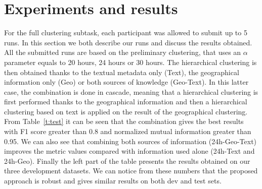 \documentclass{acm_proc_article-me11_tweaked}
\begin{document}
\section{Experiments and results}
For the full clustering subtask, each participant was allowed to submit up to 5 runs. 
In this section we both describe our runs and discuss the results obtained.
All the submitted runs are based on the preliminary clustering, that uses an $\alpha$ parameter equals to 20 hours, 24 hours or 30 hours. The hierarchical clustering is then obtained thanks to the textual metadata only (Text), the geographical information only (Geo) or both sources of knowledge (Geo-Text). In this latter case, the combination is done in cascade, meaning that a hierarchical clustering is first performed thanks to the geographical information and then a hierarchical clustering based on text is applied on the result of the geographical clustering.
From Table~\ref{t:test} it can be seen that the combination gives the best results with F1 score greater than 0.8 and normalized mutual information greater than 0.95. We can also see that combining both sources of information (24h-Geo-Text) improves the metric values compared with information used alone (24h-Text and  24h-Geo). Finally the left part of the table presents the results obtained on our three development datasets. We can notice from these numbers that the proposed approach is robust and gives similar results on both dev and test sets.






\balancecolumns
\end{document}
